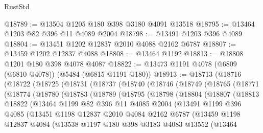 \begin{lexlean}{RustStd}
\begin{coremodule}
{\begin{coremodule}
{{{{{{{{{{{{{{{{{{{{{{{{{{{{{{{@18789 := @13504 @1205 @180 @398 @3180 @4091 @13518
@18795 := @13464 @1203 @82 @396 @11 @4089 @2004
@18798 := @13491 @1203 @396 @4089
@18804 := @13451 @1202 @12837 @2010 @4088 @2162 @6787
@18807 := @13459 @1202 @12837 @4088
@18808 := @13464 @1192
@18813 := @18808 @1201 @180 @398 @4078 @4087
@18822 := @13473 @1191 @4078 (@6809 (@6810 @4078)) (@5484 (@6815 @1191 @180))
@18913 := @18713
    (@18716
      (@18722
        (@18725
          (@18731
            (@18737
              (@18740
                (@18746
                  (@18749
                    (@18765
                      (@18771
                        (@18774
                          (@18780
                            (@18783
                              (@18789
                                (@18795
                                  (@18798
                                    (@18804
                                      (@18807
                                        (@18813
                                          @18822
                                          (@13464
                                            @1199
                                            @82
                                            @396
                                            @11
                                            @4085
                                            @2004
                                            (@13491
                                              @1199
                                              @396
                                              @4085
                                              (@13451
                                                @1198
                                                @12837
                                                @2010
                                                @4084
                                                @2162
                                                @6787
                                                (@13459
                                                  @1198
                                                  @12837
                                                  @4084
                                                  (@13538
                                                    @1197
                                                    @180
                                                    @398
                                                    @3183
                                                    @4083
                                                    @13552
                                                    (@13464
}}}}}}}}}}}}}}}}}}}}}}}}}}}}}}}
\end{coremodule}}
\end{coremodule}
\end{lexlean}
